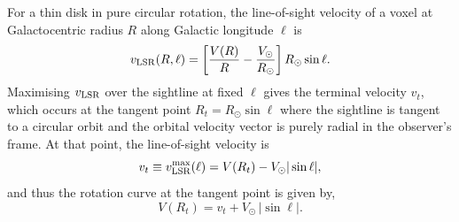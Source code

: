 \documentclass[10pt,preprint2]{aastex}
\begin{document}
For a thin disk in pure circular rotation, the line-of-sight velocity of a voxel at Galactocentric radius $R$ along Galactic longitude $\ell$ is
\begin{equation}
v_{\rm LSR}(R, \ell) = \left[\frac{V(R)}{R} - \frac{V_\odot}{R_\odot}\right] R_\odot \sin\ell.
\label{eq:vlsr}
\end{equation}
Maximising $v_{\rm LSR}$ over the sightline at fixed $\ell$ gives the terminal velocity $v_t$, which occurs at the tangent point $R_t = R_\odot \sin\ell$ where the sightline is tangent to a circular orbit and the orbital velocity vector is purely radial in the observer's frame. At that point, the line-of-sight velocity is
\begin{equation}
v_t \equiv v_{\rm LSR}^{\max}(\ell) = V(R_t) - V_\odot |\sin\ell|,
\label{eq:vt_def}
\end{equation}
and thus the rotation curve at the tangent point is given by,
\begin{equation}
V(R_t) = v_t + V_\odot\,|\sin\ell|.
\label{eq:vt}
\end{equation}
\end{document}
